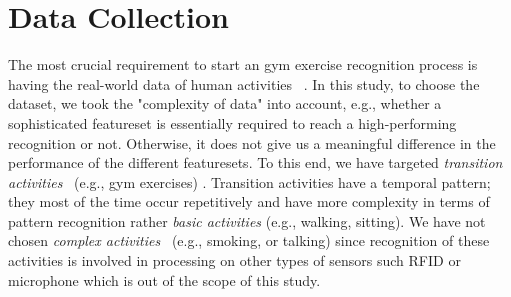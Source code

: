 \documentclass[journal,article,submit,moreauthors,pdftex]{Definitions/mdpi}
\begin{document}
%
%
%
%

\section{Data Collection}

The most crucial requirement to start an gym exercise recognition process is having the real-world data of human activities ~\cite{morris2014recofit}. 
In this study, to choose the dataset, we took the "complexity of data" into account, e.g., whether a sophisticated featureset is essentially required to reach a high-performing recognition or not. Otherwise, it does not give us a meaningful difference in the performance of the different featuresets. To this end, we have targeted \textit{transition activities}~\cite{wang2019survey, mortazavi2014determining} (e.g., gym exercises) . Transition activities have a temporal pattern; they most of the time occur repetitively and have more complexity in terms of pattern recognition rather \textit{basic activities} (e.g., walking, sitting). We have not chosen \textit{complex activities}~\cite{wang2019survey} (e.g., smoking, or talking) since recognition of these activities is involved in processing on other types of sensors such RFID or microphone which is out of the scope of this study.
\end{document}

